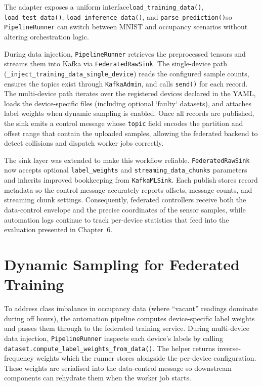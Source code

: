 The adapter exposes a uniform interface\textemdash\texttt{load\_training\_data()}, \texttt{load\_test\_data()}, \texttt{load\_inference\_data()}, and \texttt{parse\_prediction()}\textemdash so \texttt{PipelineRunner} can switch between MNIST and occupancy scenarios without altering orchestration logic.

During data injection, \texttt{PipelineRunner} retrieves the preprocessed tensors and streams them into Kafka via \texttt{FederatedRawSink}. The single-device path (\texttt{\_inject\_training\_data\_single\_device}) reads the configured sample counts, ensures the topics exist through \texttt{KafkaAdmin}, and calls \texttt{send()} for each record. The multi-device path iterates over the registered devices declared in the YAML, loads the device-specific files (including optional `faulty` datasets), and attaches label weights when dynamic sampling is enabled. Once all records are published, the sink emits a control message whose \texttt{topic} field encodes the partition and offset range that contain the uploaded samples, allowing the federated backend to detect collisions and dispatch worker jobs correctly.

The sink layer was extended to make this workflow reliable. \texttt{FederatedRawSink} now accepts optional \texttt{label\_weights} and \texttt{streaming\_data\_chunks} parameters and inherits improved bookkeeping from \texttt{KafkaMLSink}. Each publish stores record metadata so the control message accurately reports offsets, message counts, and streaming chunk settings. Consequently, federated controllers receive both the data-control envelope and the precise coordinates of the sensor samples, while automation logs continue to track per-device statistics that feed into the evaluation presented in Chapter~6.

\section{Dynamic Sampling for Federated Training}
\label{sec:dynamic_sampling}

To address class imbalance in occupancy data (where ``vacant'' readings dominate during off hours), the automation pipeline computes device-specific label weights and passes them through to the federated training service. During multi-device data injection, \texttt{PipelineRunner} inspects each device’s labels by calling \texttt{dataset.compute\_label\_weights\_from\_data()}. The helper returns inverse-frequency weights which the runner stores alongside the per-device configuration. These weights are serialised into the data-control message so downstream components can rehydrate them when the worker job starts.

